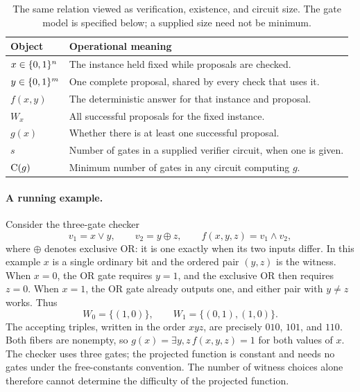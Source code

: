 \begin{table}[htbp]
\centering
\begin{tabularx}{\linewidth}{@{}lX@{}}
\toprule
Object & Operational meaning \\
\midrule
$x\in\{0,1\}^n$ & The instance held fixed while proposals are checked. \\
$y\in\{0,1\}^m$ & One complete proposal, shared by every check that uses it. \\
$f(x,y)$ & The deterministic answer for that instance and proposal. \\
$W_x$ & All successful proposals for the fixed instance. \\
$g(x)$ & Whether there is at least one successful proposal. \\
$s$ & Number of gates in a supplied verifier circuit, when one is given. \\
$\mathrm{C}(g)$ & Minimum number of gates in any circuit computing $g$. \\
\bottomrule
\end{tabularx}
\caption{The same relation viewed as verification, existence, and circuit size.
The gate model is specified below; a supplied size need not be minimum.}
\label{tab:foundations-vocabulary}
\end{table}

\paragraph{A running example.}
Consider the three-gate checker
\begin{equation}\label{eq:foundations-example}
 v_1=x\lor y,\qquad v_2=y\oplus z,\qquad
 f(x,y,z)=v_1\land v_2,
\end{equation}
where $\oplus$ denotes exclusive OR: it is one exactly when its two inputs
differ. In this example $x$ is a single ordinary bit and the ordered pair
$(y,z)$ is the witness. When $x=0$, the OR gate requires $y=1$, and the
exclusive OR then requires $z=0$. When $x=1$, the OR gate already outputs
one, and either pair with $y\ne z$ works. Thus
\[
 W_0=\{(1,0)\},\qquad W_1=\{(0,1),(1,0)\}.
\]
The accepting triples, written in the order $xyz$, are precisely
$010$, $101$, and $110$. Both fibers are nonempty, so
$g(x)=\exists y,z\,f(x,y,z)=1$ for both values of $x$.
The checker uses three gates; the projected function is constant and needs
no gates under the free-constants convention. The number of witness choices
alone therefore cannot determine the difficulty of the projected function.

